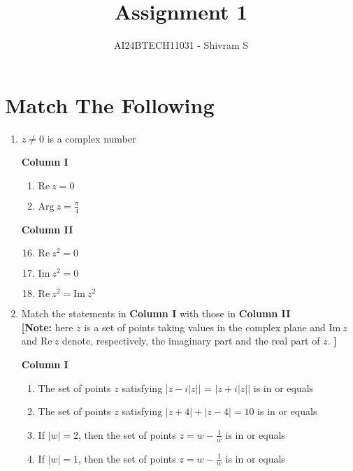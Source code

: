 \documentclass[journal,12pt,twocolumn]{IEEEtran}
\theoremstyle{remark}
\newcommand{\RE}{\mathrm{Re}}
\newcommand{\IM}{\mathrm{Im}}
\begin{document}


\title{Assignment 1}
\author{AI24BTECH11031 - Shivram S}
\maketitle
\newpage
\bigskip

\renewcommand{\thefigure}{\theenumi}
\renewcommand{\thetable}{\theenumi}
\section*{Match The Following}

\begin{enumerate}[label=\arabic*)]
	\item $z \ne 0$ is a complex number
		\hfill {}

		\begin{multicols}{2}
			\textbf{Column I}
			\begin{enumerate}[label=(\Alph*)]
				\item $\RE\ z = 0$
				\item $\mathrm{Arg}\ z = \frac\pi4$
			\end{enumerate}
			\columnbreak
			\textbf{Column II}
			\begin{enumerate}[label=(\alph*)]
					\setcounter{enumii}{15}
				\item $\RE\ z^2 = 0$
				\item $\IM\ z^2 = 0$
				\item $\RE\ z^2 = \IM\ z^2$
			\end{enumerate}
		\end{multicols}

	\item Match the statements in \textbf{Column I} with those in \textbf{Column II}
		\hfill {} \\
		\textbf{[Note:} here $z$ is a set of points taking values in the complex plane and $\IM\ z$ and $\RE\ z$
		denote, respectively, the imaginary part and the real part of $z$. \textbf{]}

		\textbf{Column I}
		\begin{enumerate}[label=(\Alph*)]
			\item The set of points $z$ satisfying $|z - i|z||$ = $|z + i|z||$ is in or equals
			\item The set of points $z$ satisfying $|z + 4| + |z - 4| = 10$ is in or equals
			\item If $|w| = 2$, then the set of points $z = w - \frac 1 w$ is in or equals
			\item If $|w| = 1$, then the set of points $z = w - \frac 1 w$ is in or equals
		\end{enumerate}


\end{enumerate}
\end{document}
